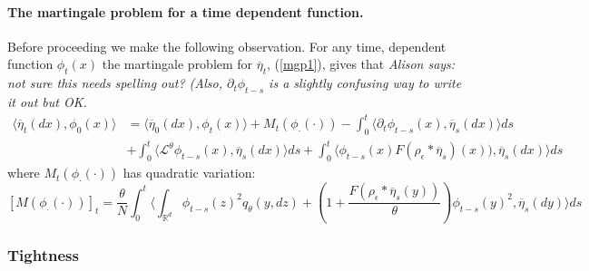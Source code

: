 \documentclass[12pt]{article}
\newcommand{\comment}[1]{{\color{blue} \it #1}}
\begin{document}
\paragraph{The martingale problem for a time dependent function.}
Before proceeding we make the following observation. For any time, dependent function $\phi_t(x)$ the martingale problem for $\overline{\eta}_t$, (\ref{mgp1}), gives that
\comment{Alison says: not sure this needs spelling out? (Also, $\partial_t \phi_{t-s}$ is a slightly confusing way to write it out but OK.}
\begin{align}
\langle \overline{\eta}_t(dx), \phi_0(x)\rangle &= \langle \overline{\eta}_0(dx), \phi_t(x)\rangle +  M_t(\phi_\cdot(\cdot)) - \int_0^t \langle \partial_t \phi_{t-s}(x), \overline{\eta}_s(dx) \rangle  ds \nonumber \\ & + \int_0^t \langle \mathcal{L}^\theta \phi_{t-s}(x), \overline{\eta}_s(dx) \rangle ds+ \int_{0}^t \langle \phi_{t-s}(x)F (\rho_\epsilon*\overline{\eta}_s)(x) ) , \overline{\eta}_s(dx) \rangle ds \label{timeMGP}
\end{align}
where $M_t(\phi_\cdot(\cdot))$ has quadratic variation:
\[ [M(\phi_\cdot(\cdot))]_t = \frac{\theta}{N}\int_0^t \langle \int_{\mathbb{R}^d} \phi_{t-s}(z)^2 q_\theta(y,dz) + \left( 1 + \frac{F(\rho_\epsilon*\overline{\eta}_s(y))}{\theta}\right) \phi_{t-s}(y)^2, \overline{\eta}_s(dy) \rangle ds \]

\subsubsection{Tightness}
\end{document}
